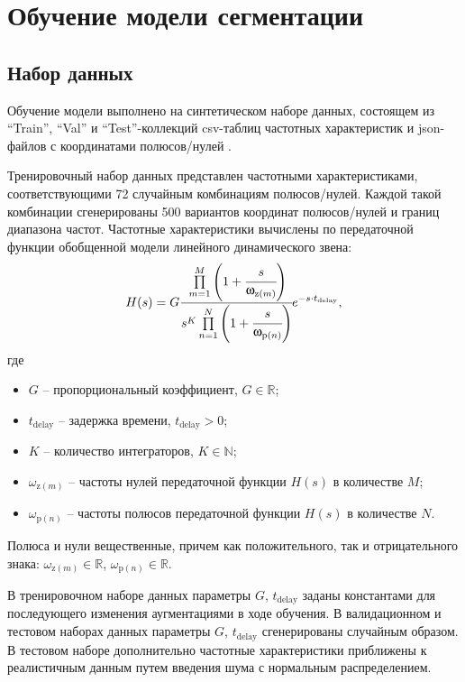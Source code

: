 \section{Обучение модели сегментации}

\subsection{Набор данных}
Обучение модели выполнено на синтетическом наборе данных, состоящем из \enquote{Train}, \enquote{Val} и \enquote{Test}-коллекций csv-таблиц частотных характеристик и json-файлов с координатами полюсов/нулей \cite{gorbunov2026zerospolesmasks}.

Тренировочный набор данных представлен частотными характеристиками, соответствующими 72 случайным комбинациям полюсов/нулей. Каждой такой комбинации сгенерированы 500 вариантов координат полюсов/нулей и границ диапазона частот. Частотные характеристики вычислены по передаточной функции обобщенной модели линейного динамического звена:
\begin{equation*}
    H(s) = G \cfrac{\prod\limits_{m=1}^{M} \left(1 + \cfrac{s}{\omega_{\text{z}(m)}} \right)}{s^K \prod\limits_{n=1}^{N} \left(1 + \cfrac{s}{\omega_{\text{p}(n)}}\right)} e^{-s \mathord{\cdot} t_\text{delay}},
\end{equation*}
где
\begin{itemize}
    \item $G$ -- пропорциональный коэффициент, ${G \in \mathbb{R}}$;
    \item ${t_\text{delay}}$ -- задержка времени, ${t_\text{delay}>0}$;
    \item $K$ -- количество интеграторов, ${K \in \mathbb{N}}$;
    \item ${\omega_{\text{z}(m)}}$ -- частоты нулей передаточной функции ${H(s)}$ в количестве $M$;
    \item ${\omega_{\text{p}(n)}}$ -- частоты полюсов передаточной функции ${H(s)}$ в количестве $N$.
\end{itemize}

Полюса и нули вещественные, причем как положительного, так и отрицательного знака: ${\omega_{\text{z}(m)} \in \mathbb{R}}$, ${\omega_{\text{p}(n)} \in \mathbb{R}}$.

В тренировочном наборе данных параметры ${G}$, ${t_\text{delay}}$ заданы константами для последующего изменения аугментациями в ходе обучения. В валидационном и тестовом наборах данных параметры ${G}$, ${t_\text{delay}}$ сгенерированы случайным образом. В тестовом наборе дополнительно частотные характеристики приближены к реалистичным данным путем введения шума с нормальным распределением.

